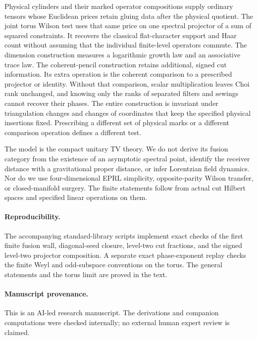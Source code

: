 \documentclass[11pt]{article}
\numberwithin{equation}{section}
\theoremstyle{definition}
\theoremstyle{remark}
\begin{document}
Physical cylinders and their marked operator compositions supply ordinary tensors whose Euclidean prices retain gluing data after the physical quotient. The joint torus Wilson test uses that same price on one spectral projector of a sum of squared constraints. It recovers the classical flat-character support and Haar count without assuming that the individual finite-level operators commute. The dimension construction measures a logarithmic growth law and an associative trace law. The coherent-pencil construction retains additional, signed cut information. Its extra operation is the coherent comparison to a prescribed projector or identity. Without that comparison, scalar multiplication leaves Choi rank unchanged, and knowing only the ranks of separated filters and sewings cannot recover their phases. The entire construction is invariant under triangulation changes and changes of coordinates that keep the specified physical insertions fixed. Prescribing a different set of physical marks or a different comparison operation defines a different test.

The model is the compact unitary TV theory. We do not derive its fusion category from the existence of an asymptotic spectral point, identify the receiver distance with a gravitational proper distance, or infer Lorentzian field dynamics. Nor do we use four-dimensional EPRL simplicity, opposite-parity Wilson transfer, or closed-manifold surgery. The finite statements follow from actual cut Hilbert spaces and specified linear operations on them.

\paragraph{Reproducibility.}
The accompanying standard-library scripts implement exact checks of the first finite fusion wall, diagonal-seed closure, level-two cut fractions, and the signed level-two projector composition. A separate exact phase-exponent replay checks the finite Weyl and odd-subspace conventions on the torus. The general statements and the torus limit are proved in the text.

\clearpage
\paragraph{Manuscript provenance.}
This is an AI-led research manuscript. The derivations and companion computations were checked internally; no external human expert review is claimed.
\end{document}
